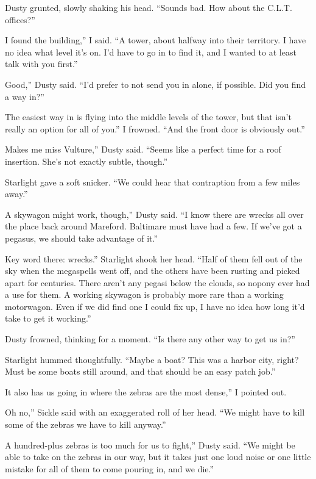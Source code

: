 Dusty grunted, slowly shaking his head. “Sounds bad. How about the C.L.T. offices?”

\leavevmode{}I found the building,” I said. “A tower, about halfway into their territory. I have no idea what level it’s on. I’d have to go in to find it, and I wanted to at least talk with you first.”

\leavevmode{}Good,” Dusty said. “I’d prefer to not send you in alone, if possible. Did you find a way in?”

\leavevmode{}The easiest way in is flying into the middle levels of the tower, but that isn’t really an option for all of you.” I frowned. “And the front door is obviously out.”

\leavevmode{}Makes me miss Vulture,” Dusty said. “Seems like a perfect time for a roof insertion. She’s not exactly subtle, though.”

Starlight gave a soft snicker. “We could hear that contraption from a few miles away.”

\leavevmode{}A skywagon might work, though,” Dusty said. “I know there are wrecks all over the place back around Mareford. Baltimare must have had a few. If we’ve got a pegasus, we should take advantage of it.”

\leavevmode{}Key word there: wrecks.” Starlight shook her head. “Half of them fell out of the sky when the megaspells went off, and the others have been rusting and picked apart for centuries. There aren’t any pegasi below the clouds, so nopony ever had a use for them. A working skywagon is probably more rare than a working motorwagon. Even if we did find one I could fix up, I have no idea how long it’d take to get it working.”

Dusty frowned, thinking for a moment. “Is there any other way to get us in?”

Starlight hummed thoughtfully. “Maybe a boat? This was a harbor city, right? Must be some boats still around, and that should be an easy patch job.”

\leavevmode{}It also has us going in where the zebras are the most dense,” I pointed out.

\leavevmode{}Oh no,” Sickle said with an exaggerated roll of her head. “We might have to kill some of the zebras we have to kill anyway.”

\leavevmode{}A hundred-plus zebras is too much for us to fight,” Dusty said. “We might be able to take on the zebras in our way, but it takes just one loud noise or one little mistake for all of them to come pouring in, and we die.”

